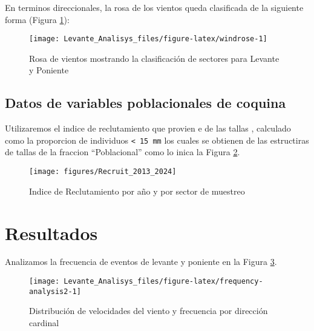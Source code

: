 \documentclass[
]{article}
\begin{document}
En terminos direccionales, la rosa de los vientos queda clasificada de la siguiente forma (Figura \ref{fig:windrose}):

\begin{figure}

{\centering \texttt{[image: Levante\_Analisys\_files/figure-latex/windrose-1]} 

}

\caption{Rosa de vientos mostrando la clasificación de sectores para Levante y Poniente}\label{fig:windrose}
\end{figure}

\subsection{Datos de variables poblacionales de coquina}\label{datos-de-variables-poblacionales-de-coquina}

Utilizaremos el indice de reclutamiento que provien e de las tallas , calculado como la proporcion de individuos \texttt{\textless{}\ 15\ mm} los cuales se obtienen de las estructiras de tallas de la fraccion ``Poblacional'' como lo inica la Figura \ref{fig:recl}.

\begin{figure}

{\centering \texttt{[image: figures/Recruit\_2013\_2024]} 

}

\caption{Indice de Reclutamiento por año y por sector de muestreo}\label{fig:recl}
\end{figure}

\newpage

\section{Resultados}\label{resultados}

Analizamos la frecuencia de eventos de levante y poniente en la Figura \ref{fig:frequency-analysis2}.

\begin{figure}

{\centering \texttt{[image: Levante\_Analisys\_files/figure-latex/frequency-analysis2-1]} 

}

\caption{Distribución de velocidades del viento y frecuencia por dirección cardinal}\label{fig:frequency-analysis2}
\end{figure}
\end{document}
